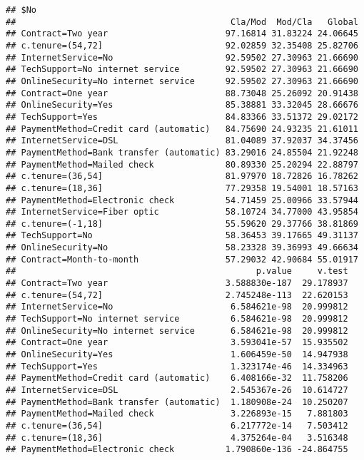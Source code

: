 \documentclass[
]{article}
\begin{document}
\begin{verbatim}
## $No
##                                          Cla/Mod  Mod/Cla   Global
## Contract=Two year                       97.16814 31.83224 24.06645
## c.tenure=(54,72]                        92.02859 32.35408 25.82706
## InternetService=No                      92.59502 27.30963 21.66690
## TechSupport=No internet service         92.59502 27.30963 21.66690
## OnlineSecurity=No internet service      92.59502 27.30963 21.66690
## Contract=One year                       88.73048 25.26092 20.91438
## OnlineSecurity=Yes                      85.38881 33.32045 28.66676
## TechSupport=Yes                         84.83366 33.51372 29.02172
## PaymentMethod=Credit card (automatic)   84.75690 24.93235 21.61011
## InternetService=DSL                     81.04089 37.92037 34.37456
## PaymentMethod=Bank transfer (automatic) 83.29016 24.85504 21.92248
## PaymentMethod=Mailed check              80.89330 25.20294 22.88797
## c.tenure=(36,54]                        81.97970 18.72826 16.78262
## c.tenure=(18,36]                        77.29358 19.54001 18.57163
## PaymentMethod=Electronic check          54.71459 25.00966 33.57944
## InternetService=Fiber optic             58.10724 34.77000 43.95854
## c.tenure=(-1,18]                        55.59620 29.37766 38.81869
## TechSupport=No                          58.36453 39.17665 49.31137
## OnlineSecurity=No                       58.23328 39.36993 49.66634
## Contract=Month-to-month                 57.29032 42.90684 55.01917
##                                               p.value     v.test
## Contract=Two year                       3.588830e-187  29.178937
## c.tenure=(54,72]                        2.745248e-113  22.620153
## InternetService=No                       6.584621e-98  20.999812
## TechSupport=No internet service          6.584621e-98  20.999812
## OnlineSecurity=No internet service       6.584621e-98  20.999812
## Contract=One year                        3.593041e-57  15.935502
## OnlineSecurity=Yes                       1.606459e-50  14.947938
## TechSupport=Yes                          1.323174e-46  14.334963
## PaymentMethod=Credit card (automatic)    6.408166e-32  11.758206
## InternetService=DSL                      2.545367e-26  10.614727
## PaymentMethod=Bank transfer (automatic)  1.180908e-24  10.250207
## PaymentMethod=Mailed check               3.226893e-15   7.881803
## c.tenure=(36,54]                         6.217772e-14   7.503412
## c.tenure=(18,36]                         4.375264e-04   3.516348
## PaymentMethod=Electronic check          1.790860e-136 -24.864755

\end{verbatim}
\end{document}
